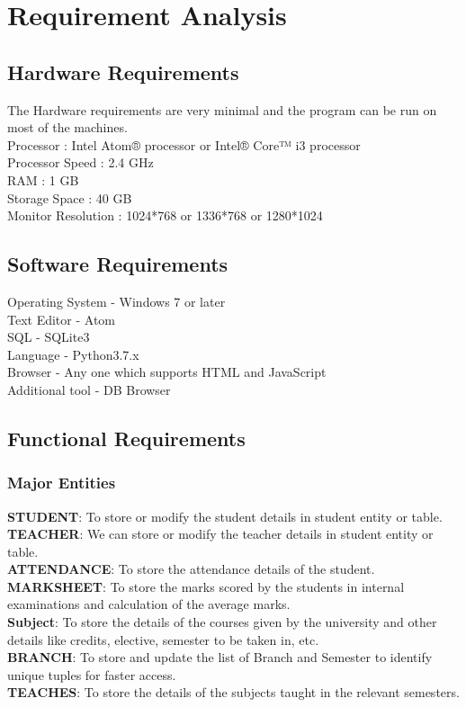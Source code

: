 \chapter{Requirement Analysis}

\section{Hardware Requirements}
The Hardware requirements are very minimal and the program can be run on most of
the machines. \\
Processor : Intel Atom® processor or Intel® Core™ i3 processor\\
Processor Speed : 2.4 GHz\\
RAM : 1 GB\\
Storage Space : 40 GB\\
Monitor Resolution : 1024*768 or 1336*768 or 1280*1024\\
\thispagestyle{fancy}

\section{Software Requirements}
Operating System - Windows 7 or later\\
Text Editor - Atom\\
SQL - SQLite3\\
Language - Python3.7.x\\
Browser - Any one which supports HTML and JavaScript\\
Additional tool - DB Browser\\
\thispagestyle{fancy}
\pagebreak
\section{Functional Requirements}
\subsection{Major Entities}
\textbf{STUDENT}: To store or modify the student details in student entity or table.\\
\textbf{TEACHER}: We can store or modify the teacher details in student entity or table.\\
\textbf{ATTENDANCE}: To store the attendance details of the student.\\
\textbf{MARKSHEET}: To store the marks scored by the students in internal examinations and calculation of the average marks.\\
\textbf{Subject}: To store the details of the courses given by the university and other details like credits, elective, semester to be taken in, etc.\\
\textbf{BRANCH}: To store and update the list of Branch and Semester to identify unique tuples for faster access.\\
\textbf{TEACHES}: To store the details of the subjects taught in the relevant semesters.\\

